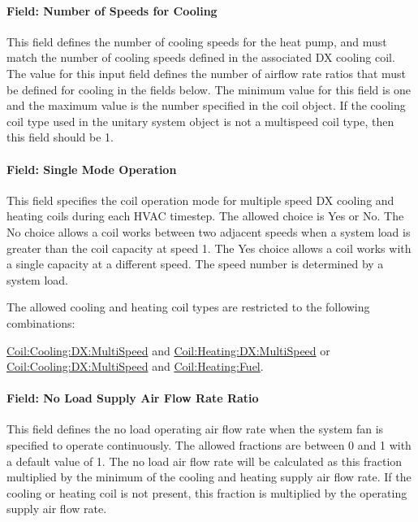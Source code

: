 \paragraph{Field: Number of Speeds for Cooling}\label{field-number-of-speeds-for-cooling-000}

This field defines the number of cooling speeds for the heat pump, and must match the number of cooling speeds defined in the associated DX cooling coil. The value for this input field defines the number of airflow rate ratios that must be defined for cooling in the fields below. The minimum value for this field is one and the maximum value is the number specified in the coil object. If the cooling coil type used in the unitary system object is not a multispeed coil type, then this field should be 1.

\paragraph{Field: Single Mode Operation}\label{field-single-mode-operation}

This field specifies the coil operation mode for multiple speed DX cooling and heating coils during each HVAC timestep. The allowed choice is Yes or No. The No choice allows a coil works between two adjacent speeds when a system load is greater than the coil capacity at speed 1. The Yes choice allows a coil works with a single capacity at a different speed. The speed number is determined by a system load.

The allowed cooling and heating coil types are restricted to the following combinations:

\hyperref[coilcoolingdxmultispeed]{Coil:Cooling:DX:MultiSpeed} and \hyperref[coilheatingdxmultispeed]{Coil:Heating:DX:MultiSpeed} or \hyperref[coilcoolingdxmultispeed]{Coil:Cooling:DX:MultiSpeed} and \hyperref[coilheatinggas-000]{Coil:Heating:Fuel}.

\paragraph{Field: No Load Supply Air Flow Rate Ratio}\label{field-no-load-supply-air-flow-rate-ratio}

This field defines the no load operating air flow rate when the system fan is specified to operate continuously. The allowed fractions are between 0 and 1 with a default value of 1. The no load air flow rate will be calculated as this fraction multiplied by the minimum of the cooling and heating supply air flow rate. If the cooling or heating coil is not present, this fraction is multiplied by the operating supply air flow rate.


